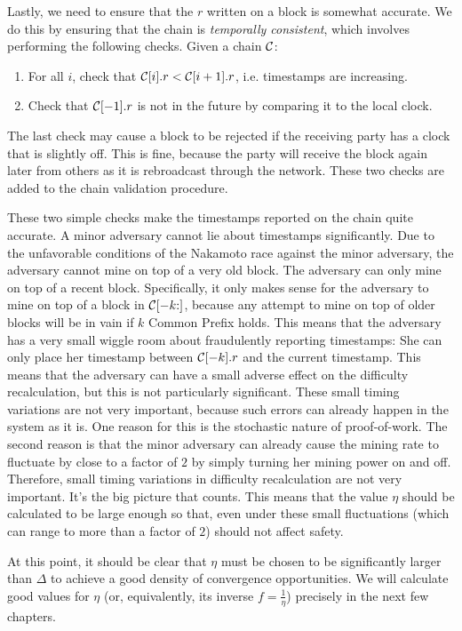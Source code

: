 Lastly, we need to ensure that the $r$ written on a block is somewhat
accurate. We do this by ensuring that the chain is \emph{temporally consistent},
which involves performing the following checks. Given a chain $\mathcal{C}$:

\begin{enumerate}
  \item For all $i$, check that $\mathcal{C}[i].r < \mathcal{C}[i + 1].r$, i.e. timestamps are increasing.
  \item Check that $\mathcal{C}[-1].r$ is not in the future by comparing it to the local clock.
\end{enumerate}

The last check may cause a block to be rejected if the receiving party
has a clock that is slightly off. This is fine, because the party will
receive the block again later from others as it is rebroadcast through
the network. These two checks are added to the chain validation procedure.

These two simple checks make the timestamps reported on the chain quite
accurate. A minor adversary cannot lie about timestamps significantly.
Due to the unfavorable conditions of the Nakamoto race against the minor
adversary, the adversary cannot mine on top of a very old block. The
adversary can only mine on top of a recent block. Specifically, it only
makes sense for the adversary to mine on top of a block in
$\mathcal{C}[{-k}{:}]$, because any attempt to mine on top of older blocks
will be in vain if $k$ Common Prefix holds. This means that the adversary
has a very small wiggle room about fraudulently reporting timestamps:
She can only place her timestamp between $\mathcal{C}[{-k}].r$ and the current
timestamp. This means that the adversary can have a small adverse effect
on the difficulty recalculation, but this is not particularly significant.
These small timing variations are not very important, because such errors
can already happen in the system as it is. One reason for this is the
stochastic nature of proof-of-work.
The second reason is that the minor adversary can already cause the mining rate to fluctuate
by close to a factor of $2$ by simply turning her mining power on and off.
Therefore, small timing variations in difficulty recalculation are not very important.
It's the big picture that counts. This means that the value $\eta$ should be
calculated to be large enough so that, even under these small fluctuations
(which can range to more than a factor of $2$) should not affect safety.

At this point, it should be clear that $\eta$ must be chosen to be significantly
larger than $\Delta$ to achieve a good density of convergence opportunities.
We will calculate good values for $\eta$ (or, equivalently, its inverse $f = \frac{1}{\eta}$)
precisely in the next few chapters.

